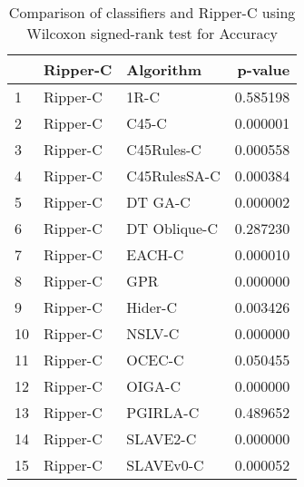 \begin{table}
\footnotesize
\caption{Comparison of classifiers and Ripper-C using Wilcoxon signed-rank test for Accuracy}
\label{tab:Ripper-C wilcoxon Accuracy comparison}
\begin{tabular}{lllr}
\hline
 & Ripper-C & Algorithm & p-value \\
\hline
1 & Ripper-C & 1R-C & 0.585198 \\
2 & Ripper-C & C45-C & 0.000001 \\
3 & Ripper-C & C45Rules-C & 0.000558 \\
4 & Ripper-C & C45RulesSA-C & 0.000384 \\
5 & Ripper-C & DT GA-C & 0.000002 \\
6 & Ripper-C & DT Oblique-C & 0.287230 \\
7 & Ripper-C & EACH-C & 0.000010 \\
8 & Ripper-C & GPR & 0.000000 \\
9 & Ripper-C & Hider-C & 0.003426 \\
10 & Ripper-C & NSLV-C & 0.000000 \\
11 & Ripper-C & OCEC-C & 0.050455 \\
12 & Ripper-C & OIGA-C & 0.000000 \\
13 & Ripper-C & PGIRLA-C & 0.489652 \\
14 & Ripper-C & SLAVE2-C & 0.000000 \\
15 & Ripper-C & SLAVEv0-C & 0.000052 \\
\hline
\end{tabular}
\end{table}

